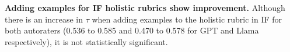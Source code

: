 \textbf{Adding examples for IF holistic rubrics show improvement.}
Although there is an increase in $\tau$ when adding examples to the holistic rubric in IF for both autoraters (0.536 to 0.585 and 0.470 to 0.578 for GPT and Llama respectively), it is not statistically significant.








